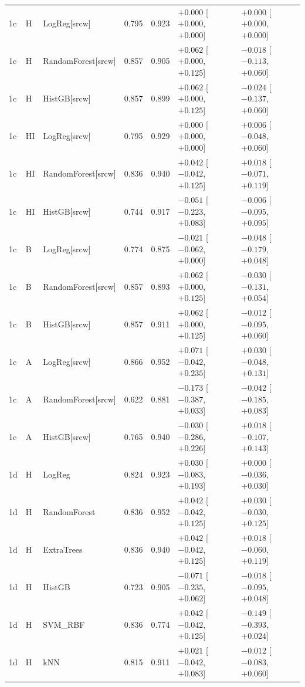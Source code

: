 {\begin{longtable}{@{}lllrrll@{}}
1c & H & LogReg[srcw] & 0.795 & 0.923 & $+0.000$ [$+0.000$, $+0.000$] & $+0.000$ [$+0.000$, $+0.000$] \\
1c & H & RandomForest[srcw] & 0.857 & 0.905 & $+0.062$ [$+0.000$, $+0.125$] & $-0.018$ [$-0.113$, $+0.060$] \\
1c & H & HistGB[srcw] & 0.857 & 0.899 & $+0.062$ [$+0.000$, $+0.125$] & $-0.024$ [$-0.137$, $+0.060$] \\
1c & HI & LogReg[srcw] & 0.795 & 0.929 & $+0.000$ [$+0.000$, $+0.000$] & $+0.006$ [$-0.048$, $+0.060$] \\
1c & HI & RandomForest[srcw] & 0.836 & 0.940 & $+0.042$ [$-0.042$, $+0.125$] & $+0.018$ [$-0.071$, $+0.119$] \\
1c & HI & HistGB[srcw] & 0.744 & 0.917 & $-0.051$ [$-0.223$, $+0.083$] & $-0.006$ [$-0.095$, $+0.095$] \\
1c & B & LogReg[srcw] & 0.774 & 0.875 & $-0.021$ [$-0.062$, $+0.000$] & $-0.048$ [$-0.179$, $+0.048$] \\
1c & B & RandomForest[srcw] & 0.857 & 0.893 & $+0.062$ [$+0.000$, $+0.125$] & $-0.030$ [$-0.131$, $+0.054$] \\
1c & B & HistGB[srcw] & 0.857 & 0.911 & $+0.062$ [$+0.000$, $+0.125$] & $-0.012$ [$-0.095$, $+0.060$] \\
1c & A & LogReg[srcw] & 0.866 & 0.952 & $+0.071$ [$-0.042$, $+0.235$] & $+0.030$ [$-0.048$, $+0.131$] \\
1c & A & RandomForest[srcw] & 0.622 & 0.881 & $-0.173$ [$-0.387$, $+0.033$] & $-0.042$ [$-0.185$, $+0.083$] \\
1c & A & HistGB[srcw] & 0.765 & 0.940 & $-0.030$ [$-0.286$, $+0.226$] & $+0.018$ [$-0.107$, $+0.143$] \\
1d & H & LogReg & 0.824 & 0.923 & $+0.030$ [$-0.083$, $+0.193$] & $+0.000$ [$-0.036$, $+0.030$] \\
1d & H & RandomForest & 0.836 & 0.952 & $+0.042$ [$-0.042$, $+0.125$] & $+0.030$ [$-0.030$, $+0.125$] \\
1d & H & ExtraTrees & 0.836 & 0.940 & $+0.042$ [$-0.042$, $+0.125$] & $+0.018$ [$-0.060$, $+0.119$] \\
1d & H & HistGB & 0.723 & 0.905 & $-0.071$ [$-0.235$, $+0.062$] & $-0.018$ [$-0.095$, $+0.048$] \\
1d & H & SVM\_RBF & 0.836 & 0.774 & $+0.042$ [$-0.042$, $+0.125$] & $-0.149$ [$-0.393$, $+0.024$] \\
1d & H & kNN & 0.815 & 0.911 & $+0.021$ [$-0.042$, $+0.083$] & $-0.012$ [$-0.083$, $+0.060$] \\

\end{longtable}}
